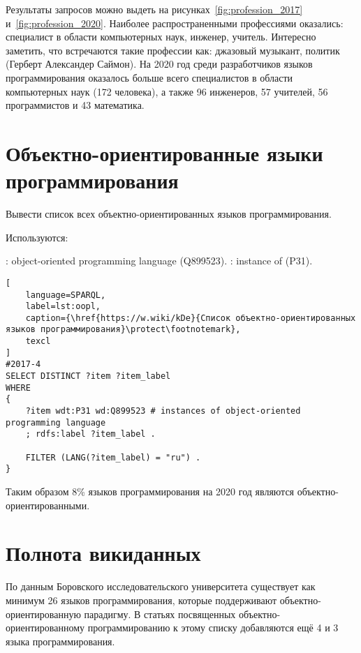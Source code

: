 Результаты запросов можно выдеть на рисунках~\ref{fig:profession_2017} и~\ref{fig:profession_2020}.
Наиболее распространенными профессиями оказались: специалист в области компьютерных наук, инженер, учитель. Интересно заметить, что встречаются такие профессии как: джазовый музыкант, политик (Герберт Александер Саймон). На 2020 год среди разработчиков языков программирования оказалось больше всего специалистов в области компьютерных наук (172 человека), а также 96 инженеров, 57 учителей, 56 программистов и 43 математика.

\section{Объектно-ориентированные языки программирования}
Вывести список всех объектно-ориентированных языков программирования.

Используются:
\begin{itemize}
: object-oriented programming language (Q899523).
: instance of (P31).
\end{itemize}

\begin{lstlisting}[
	language=SPARQL,
	label=lst:oopl,
	caption={\href{https://w.wiki/kDe}{Список объектно-ориентированных языков программирования}\protect\footnotemark},
	texcl
]
#2017-4
SELECT DISTINCT ?item ?item_label
WHERE
{
    ?item wdt:P31 wd:Q899523 # instances of object-oriented programming language
    ; rdfs:label ?item_label . 

    FILTER (LANG(?item_label) = "ru") . 
}
\end{lstlisting}


Таким образом 8\% языков программирования на 2020 год являются объектно-ориентированными.

\section{Полнота викиданных}
По данным Боровского исследовательского университета существует как минимум 26 языков программирования, которые поддерживают объектно-ориентированную парадигму. В статьях посвященных объектно-ориентированному программированию к этому списку добавляются ещё 4 и 3 языка программирования. 

